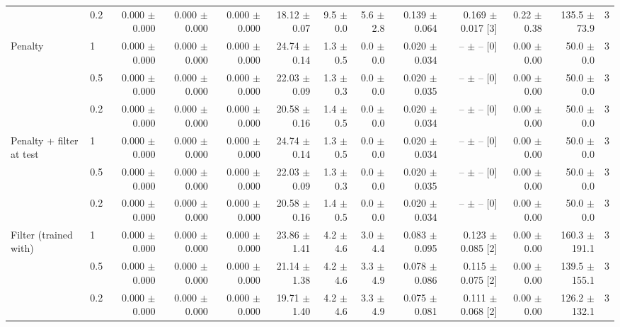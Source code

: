 {\begin{tabular}{llrrrrrrrrrrr}
 & 0.2 & 0.000 $\pm$ 0.000 & 0.000 $\pm$ 0.000 & 0.000 $\pm$ 0.000 & 18.12 $\pm$ 0.07 & 9.5 $\pm$ 0.0 & 5.6 $\pm$ 2.8 & 0.139 $\pm$ 0.064 & 0.169 $\pm$ 0.017 [3] & 0.22 $\pm$ 0.38 & 135.5 $\pm$ 73.9 & 3 \\
\addlinespace
Penalty & 1 & 0.000 $\pm$ 0.000 & 0.000 $\pm$ 0.000 & 0.000 $\pm$ 0.000 & 24.74 $\pm$ 0.14 & 1.3 $\pm$ 0.5 & 0.0 $\pm$ 0.0 & 0.020 $\pm$ 0.034 & -- $\pm$ -- [0] & 0.00 $\pm$ 0.00 & 50.0 $\pm$ 0.0 & 3 \\
 & 0.5 & 0.000 $\pm$ 0.000 & 0.000 $\pm$ 0.000 & 0.000 $\pm$ 0.000 & 22.03 $\pm$ 0.09 & 1.3 $\pm$ 0.3 & 0.0 $\pm$ 0.0 & 0.020 $\pm$ 0.035 & -- $\pm$ -- [0] & 0.00 $\pm$ 0.00 & 50.0 $\pm$ 0.0 & 3 \\
 & 0.2 & 0.000 $\pm$ 0.000 & 0.000 $\pm$ 0.000 & 0.000 $\pm$ 0.000 & 20.58 $\pm$ 0.16 & 1.4 $\pm$ 0.5 & 0.0 $\pm$ 0.0 & 0.020 $\pm$ 0.034 & -- $\pm$ -- [0] & 0.00 $\pm$ 0.00 & 50.0 $\pm$ 0.0 & 3 \\
\addlinespace
Penalty + filter at test & 1 & 0.000 $\pm$ 0.000 & 0.000 $\pm$ 0.000 & 0.000 $\pm$ 0.000 & 24.74 $\pm$ 0.14 & 1.3 $\pm$ 0.5 & 0.0 $\pm$ 0.0 & 0.020 $\pm$ 0.034 & -- $\pm$ -- [0] & 0.00 $\pm$ 0.00 & 50.0 $\pm$ 0.0 & 3 \\
 & 0.5 & 0.000 $\pm$ 0.000 & 0.000 $\pm$ 0.000 & 0.000 $\pm$ 0.000 & 22.03 $\pm$ 0.09 & 1.3 $\pm$ 0.3 & 0.0 $\pm$ 0.0 & 0.020 $\pm$ 0.035 & -- $\pm$ -- [0] & 0.00 $\pm$ 0.00 & 50.0 $\pm$ 0.0 & 3 \\
 & 0.2 & 0.000 $\pm$ 0.000 & 0.000 $\pm$ 0.000 & 0.000 $\pm$ 0.000 & 20.58 $\pm$ 0.16 & 1.4 $\pm$ 0.5 & 0.0 $\pm$ 0.0 & 0.020 $\pm$ 0.034 & -- $\pm$ -- [0] & 0.00 $\pm$ 0.00 & 50.0 $\pm$ 0.0 & 3 \\
\addlinespace
Filter (trained with) & 1 & 0.000 $\pm$ 0.000 & 0.000 $\pm$ 0.000 & 0.000 $\pm$ 0.000 & 23.86 $\pm$ 1.41 & 4.2 $\pm$ 4.6 & 3.0 $\pm$ 4.4 & 0.083 $\pm$ 0.095 & 0.123 $\pm$ 0.085 [2] & 0.00 $\pm$ 0.00 & 160.3 $\pm$ 191.1 & 3 \\
 & 0.5 & 0.000 $\pm$ 0.000 & 0.000 $\pm$ 0.000 & 0.000 $\pm$ 0.000 & 21.14 $\pm$ 1.38 & 4.2 $\pm$ 4.6 & 3.3 $\pm$ 4.9 & 0.078 $\pm$ 0.086 & 0.115 $\pm$ 0.075 [2] & 0.00 $\pm$ 0.00 & 139.5 $\pm$ 155.1 & 3 \\
 & 0.2 & 0.000 $\pm$ 0.000 & 0.000 $\pm$ 0.000 & 0.000 $\pm$ 0.000 & 19.71 $\pm$ 1.40 & 4.2 $\pm$ 4.6 & 3.3 $\pm$ 4.9 & 0.075 $\pm$ 0.081 & 0.111 $\pm$ 0.068 [2] & 0.00 $\pm$ 0.00 & 126.2 $\pm$ 132.1 & 3 \\
\bottomrule\end{tabular}}
